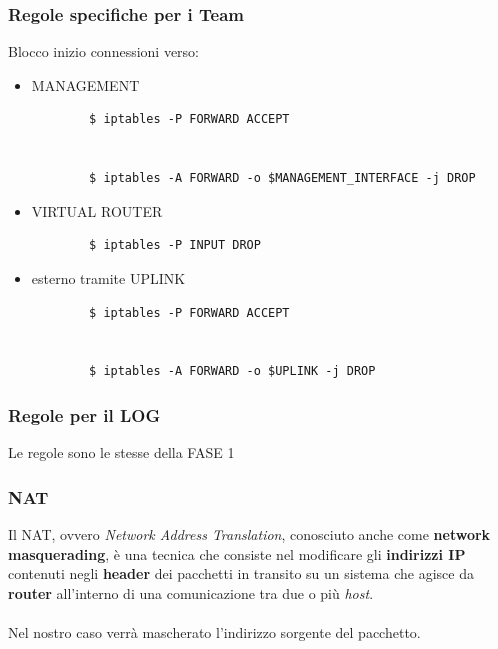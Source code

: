 \documentclass{beamer}
\begin{document}
\begin{frame}[fragile]
    \frametitle{Regole specifiche per i Team}
    Blocco inizio connessioni verso:
    \begin{itemize}
        \item MANAGEMENT
            \begin{lstlisting}
        $ iptables -P FORWARD ACCEPT


        $ iptables -A FORWARD -o $MANAGEMENT_INTERFACE -j DROP
            \end{lstlisting}
        \item VIRTUAL ROUTER
            \begin{lstlisting}
        $ iptables -P INPUT DROP  
            \end{lstlisting}
        \item esterno tramite UPLINK
            \begin{lstlisting}
        $ iptables -P FORWARD ACCEPT


        $ iptables -A FORWARD -o $UPLINK -j DROP
            \end{lstlisting}
    \end{itemize}
\end{frame}

\begin{frame}[fragile]
    \frametitle{Regole per il LOG}
    Le regole sono le stesse della FASE 1
\end{frame}

\begin{frame}
    \frametitle{NAT}
     {Il NAT, ovvero \textit{Network Address Translation}, conosciuto anche come \textbf{network masquerading}, è una tecnica
    che consiste nel modificare gli \textbf{indirizzi IP} contenuti negli \textbf{header} dei pacchetti in transito su
    un sistema che agisce da \textbf{router} all'interno di una comunicazione tra due o più \textit{host}.}
    \\~\\
     {Nel nostro caso verrà mascherato l'indirizzo sorgente del pacchetto.}

\end{frame}
\end{document}
